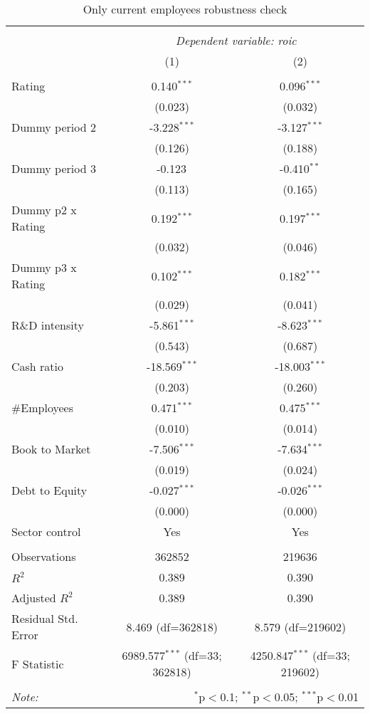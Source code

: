 \begin{table}[!htbp] \centering
  \caption{Only current employees robustness check}
\begin{tabular}{@{\extracolsep{5pt}}lcc}
\\[-1.8ex]\hline
\hline \\[-1.8ex]
& \multicolumn{2}{c}{\textit{Dependent variable: roic}} \
\cr \cline{2-3}
\\[-1.8ex] & (1) & (2) \\
\hline \\[-1.8ex]
 Rating & 0.140$^{***}$ & 0.096$^{***}$ \\
& (0.023) & (0.032) \\
 Dummy period 2 & -3.228$^{***}$ & -3.127$^{***}$ \\
& (0.126) & (0.188) \\
 Dummy period 3 & -0.123$^{}$ & -0.410$^{**}$ \\
& (0.113) & (0.165) \\
 Dummy p2 x Rating & 0.192$^{***}$ & 0.197$^{***}$ \\
& (0.032) & (0.046) \\
 Dummy p3 x Rating & 0.102$^{***}$ & 0.182$^{***}$ \\
& (0.029) & (0.041) \\
 R\&D intensity & -5.861$^{***}$ & -8.623$^{***}$ \\
& (0.543) & (0.687) \\
 Cash ratio & -18.569$^{***}$ & -18.003$^{***}$ \\
& (0.203) & (0.260) \\
 #Employees & 0.471$^{***}$ & 0.475$^{***}$ \\
& (0.010) & (0.014) \\
 Book to Market & -7.506$^{***}$ & -7.634$^{***}$ \\
& (0.019) & (0.024) \\
 Debt to Equity & -0.027$^{***}$ & -0.026$^{***}$ \\
& (0.000) & (0.000) \\
 Sector control & Yes & Yes \\
\hline \\[-1.8ex]
 Observations & 362852 & 219636 \\
 $R^2$ & 0.389 & 0.390 \\
 Adjusted $R^2$ & 0.389 & 0.390 \\
 Residual Std. Error & 8.469 (df=362818) & 8.579 (df=219602) \\
 F Statistic & 6989.577$^{***}$ (df=33; 362818) & 4250.847$^{***}$ (df=33; 219602) \\
\hline
\hline \\[-1.8ex]
\textit{Note:} & \multicolumn{2}{r}{$^{*}$p$<$0.1; $^{**}$p$<$0.05; $^{***}$p$<$0.01} \\
\end{tabular}
\end{table}